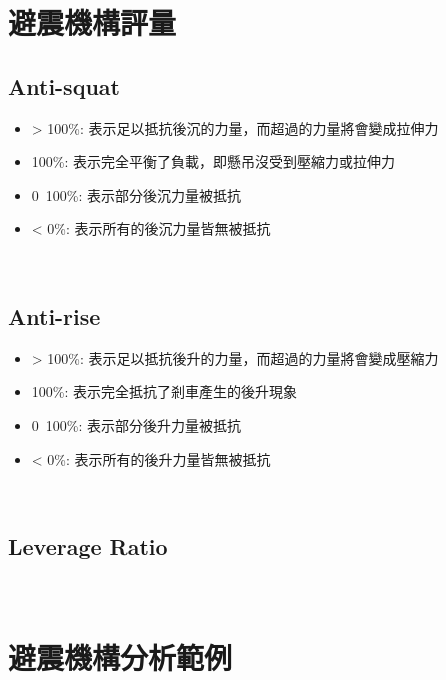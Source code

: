 \documentclass[14pt,a4paper]{report}  %
\newcommand{\fourteen}{\fontsize{14pt}{\baselineskip}\selectfont}%
\begin{document}
{{      \section{避震機構評量}
      \subsection{Anti-squat}
      \fourteen {當加速時因不同騎乘姿勢導致的重心位置變化而產生的力量轉移會讓懸架受壓縮力，而Anti-squat即為抵抗此後沉的能力。}
       \begin{itemize}
       \item > 100\%: 表示足以抵抗後沉的力量，而超過的力量將會變成拉伸力
       \item 100\%: 表示完全平衡了負載，即懸吊沒受到壓縮力或拉伸力
       \item 0~100\%: 表示部分後沉力量被抵抗
       \item < 0\%: 表示所有的後沉力量皆無被抵抗
       \end{itemize}
       \hspace*{\fill} \\
       \subsection{Anti-rise}
       \fourteen {在剎車的時候因為力量轉移的關係導致後輪產生升起的情況，而Anti-rise即為抵抗此後升現象的能力。}
       \begin{itemize}
       \item > 100\%: 表示足以抵抗後升的力量，而超過的力量將會變成壓縮力
       \item 100\%: 表示完全抵抗了剎車產生的後升現象
       \item 0~100\%: 表示部分後升力量被抵抗
       \item < 0\%: 表示所有的後升力量皆無被抵抗
       \end{itemize}
       \hspace*{\fill} \\
       \subsection{Leverage Ratio}
       \fourteen {Leverage ratio是避震器壓縮量和後輪行程的比值，當較大的槓桿比率會對避震器產生較大的衝擊，而在騎乘時對於地形變化的感受度較不敏感，相反地較小的槓桿比率對於地形的敏感度較高。}
       \hspace*{\fill} \\
      \section{避震機構分析範例}
    
}}
\end{document}
